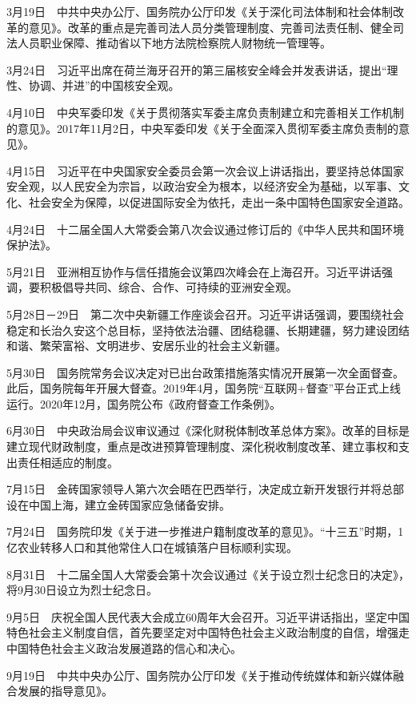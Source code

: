 \documentclass[10pt,a4paper,twocolumn]{book}
\begin{document}
3月19日　中共中央办公厅、国务院办公厅印发《关于深化司法体制和社会体制改革的意见》。改革的重点是完善司法人员分类管理制度、完善司法责任制、健全司法人员职业保障、推动省以下地方法院检察院人财物统一管理等。

3月24日　习近平出席在荷兰海牙召开的第三届核安全峰会并发表讲话，提出“理性、协调、并进”的中国核安全观。

4月10日　中央军委印发《关于贯彻落实军委主席负责制建立和完善相关工作机制的意见》。2017年11月2日，中央军委印发《关于全面深入贯彻军委主席负责制的意见》。

4月15日　习近平在中央国家安全委员会第一次会议上讲话指出，要坚持总体国家安全观，以人民安全为宗旨，以政治安全为根本，以经济安全为基础，以军事、文化、社会安全为保障，以促进国际安全为依托，走出一条中国特色国家安全道路。

4月24日　十二届全国人大常委会第八次会议通过修订后的《中华人民共和国环境保护法》。

5月21日　亚洲相互协作与信任措施会议第四次峰会在上海召开。习近平讲话强调，要积极倡导共同、综合、合作、可持续的亚洲安全观。

5月28日－29日　第二次中央新疆工作座谈会召开。习近平讲话强调，要围绕社会稳定和长治久安这个总目标，坚持依法治疆、团结稳疆、长期建疆，努力建设团结和谐、繁荣富裕、文明进步、安居乐业的社会主义新疆。

5月30日　国务院常务会议决定对已出台政策措施落实情况开展第一次全面督查。此后，国务院每年开展大督查。2019年4月，国务院“互联网+督查”平台正式上线运行。2020年12月，国务院公布《政府督查工作条例》。

6月30日　中央政治局会议审议通过《深化财税体制改革总体方案》。改革的目标是建立现代财政制度，重点是改进预算管理制度、深化税收制度改革、建立事权和支出责任相适应的制度。

7月15日　金砖国家领导人第六次会晤在巴西举行，决定成立新开发银行并将总部设在中国上海，建立金砖国家应急储备安排。

7月24日　国务院印发《关于进一步推进户籍制度改革的意见》。“十三五”时期，1亿农业转移人口和其他常住人口在城镇落户目标顺利实现。

8月31日　十二届全国人大常委会第十次会议通过《关于设立烈士纪念日的决定》，将9月30日设立为烈士纪念日。

9月5日　庆祝全国人民代表大会成立60周年大会召开。习近平讲话指出，坚定中国特色社会主义制度自信，首先要坚定对中国特色社会主义政治制度的自信，增强走中国特色社会主义政治发展道路的信心和决心。

9月19日　中共中央办公厅、国务院办公厅印发《关于推动传统媒体和新兴媒体融合发展的指导意见》。
\end{document}
